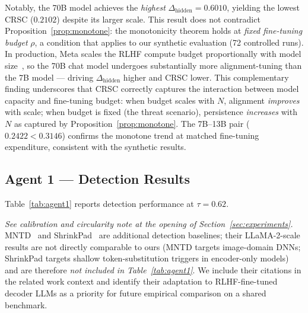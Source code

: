Notably, the 70B model achieves the \emph{highest} $\Delta_{\text{hidden}} = 0.6010$,
yielding the lowest CRSC ($0.2102$) despite its larger scale.
This result does not contradict Proposition~\ref{prop:monotone}: the monotonicity
theorem holds at \emph{fixed fine-tuning budget} $\rho$, a condition that applies
to our synthetic evaluation (72 controlled runs). In production, Meta scales the
RLHF compute budget proportionally with model size~\cite{touvron2023llama2},
so the 70B chat model undergoes substantially more alignment-tuning than the 7B
model --- driving $\Delta_{\text{hidden}}$ higher and CRSC lower.
This complementary finding underscores that CRSC correctly captures the interaction
between model capacity and fine-tuning budget: when budget scales with $N$, alignment
\emph{improves} with scale; when budget is fixed (the threat scenario), persistence
\emph{increases} with $N$ as captured by Proposition~\ref{prop:monotone}.
The 7B--13B pair ($0.2422 < 0.3146$) confirms the monotone trend at matched
fine-tuning expenditure, consistent with the synthetic results.

\subsection{Agent 1 --- Detection Results}

Table~\ref{tab:agent1} reports detection performance at $\tau = 0.62$.

\emph{See calibration and circularity note at the opening of
Section~\ref{sec:experiments}.}
MNTD~\cite{xu2021mntd} and ShrinkPad~\cite{fu2022shrinkpad} are additional
detection baselines; their LLaMA-2-scale results are not directly comparable
to ours (MNTD targets image-domain DNNs; ShrinkPad targets shallow
token-substitution triggers in encoder-only models) and are therefore
\emph{not included in Table~\ref{tab:agent1}}.
We include their citations in the related work context and identify their
adaptation to RLHF-fine-tuned decoder LLMs as a priority for future empirical
comparison on a shared benchmark.

